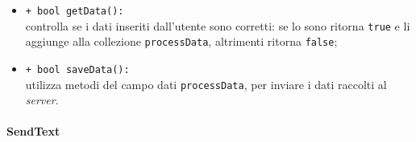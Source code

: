 \begin{flushleft}
\begin{itemize}
\begin{sloppypar}
\begin{itemize}
\item \texttt{+ bool getData():}\\ controlla se i dati inseriti dall'utente sono corretti: se lo sono ritorna \texttt{true} e li aggiunge alla collezione \texttt{processData}, altrimenti ritorna \texttt{false};
\item \texttt{+ bool saveData():}\\ utilizza metodi del campo dati \texttt{processData}, per inviare i dati raccolti al \textit{server}.
\end{itemize}
\end{sloppypar}
\end{itemize}
\end{flushleft}

\paragraph{SendText}
